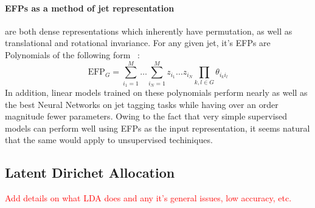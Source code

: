 \paragraph{EFPs as a method of jet representation} are both dense representations which inherently have permutation, as well as translational and rotational invariance. For any given jet, it's EFPs are Polynomials of the following form ~\cite{energyflow_poly}:
\begin{equation}
    \text{EFP}_{G} = \sum_{i_1 = 1}^{M} \dots \sum_{i_N = 1}^{M} z_{i_1} \dots z_{i_N} \prod_{k,l \in G} \theta_{i_k i_l}
\end{equation}
In addition, linear models trained on these polynomials perform nearly as well as the best Neural Networks on jet tagging tasks while having over an order magnitude fewer parameters. Owing to the fact that very simple supervised models can perform well using EFPs as the input representation, it seems natural that the same would apply to unsupervised techiniques.



\subsection{Latent Dirichet Allocation}

\textcolor{red}{Add details on what LDA does and any it's general issues, low accuracy, etc.}